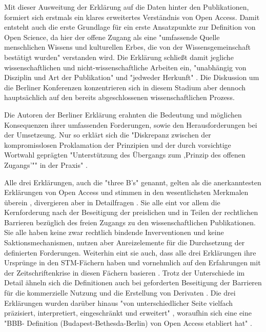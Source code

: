\begin{enumerate}
Mit dieser Ausweitung der Erklärung auf die Daten hinter den Publikationen, formiert sich erstmals ein klares erweitertes Verständnis von Open Access. Damit entsteht auch die erste Grundlage für ein erste Ansatzpunkte zur Definition von Open Science, da hier der offene Zugang als eine "umfassende Quelle menschlichen Wissens und kulturellen Erbes, die von der Wissensgemeinschaft bestätigt wurden" \cite{berliner_erklaerung_2003} verstanden wird. Die Erklärung schließt damit jegliche wissenschaftlichen und nicht-wissenschaftliche Arbeiten ein, "unabhängig von Disziplin und Art der Publikation" und "jedweder Herkunft" \cite{naeder_2010_open}. Die Diskussion um die Berliner Konferenzen konzentrieren sich in diesem Stadium aber dennoch hauptsächlich auf den bereits abgeschlossenen wissenschaftlichen Prozess.

Die Autoren der Berliner Erklärung erahnten die Bedeutung und möglichen Konsequenzen ihrer umfassenden Forderungen, sowie den Herausforderungen bei der Umsetzeung. Nur so erklärt sich die "Diskrepanz zwischen der kompromisslosen Proklamation der Prinzipien und der durch vorsichtige Wortwahl geprägten "Unterstützung des Übergangs zum ‚Prinzip des offenen Zugangs’"" in der Praxis" \cite{Lossau_oa_2007}.
\end{enumerate}

Alle drei Erklärungen, auch die "three B's" \cite{suber_2004_praising_oa} genannt, gelten als die anerkanntesten Erklärungen von Open Access und stimmen in den wesentlichsten Merkmalen überein \cite{albert_2006_open_implications}, divergieren aber in Detailfragen \cite{naeder_2010_open}. Sie alle eint vor allem die Kernforderung nach der Beseitigung der preislichen und in Teilen der rechtlichen Barrieren bezüglich des freien Zugangs zu den wissenschaftlichen Publikationen. Sie alle haben keine zwar rechtlich bindende Inverventionen und keine Saktionsmechanismen, nutzen aber Anreizelemente für die Durchsetzung der definierten Forderungen. Weiterhin eint sie auch, dass alle drei Erklärungen ihre Ursprünge in den STM-Fächern haben und vornehmlich auf den Erfahrungen mit der Zeitschriftenkrise in diesen Fächern basieren \cite{naeder_2010_open}. Trotz der Unterschiede im Detail ähneln sich die Definitionen auch bei geforderten Beseitigung der Barrieren für die kommerzielle Nutzung und die Erstellung von Derivaten \cite{CREATe_2014}. Die drei Erklärungen wurden darüber hinaus "von unterschiedlicher Seite vielfach präzisiert, interpretiert, eingeschränkt und erweitert" \cite{naeder_2010_open}, woraufhin sich eine eine "BBB-
Definition (Budapest-Bethesda-Berlin) von Open Access etabliert hat" \cite{Schirmbacher_oa_2007}.

